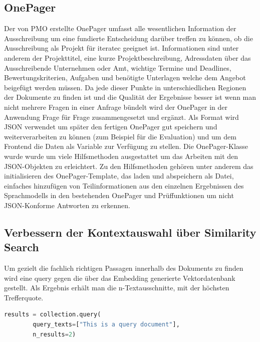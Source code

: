 \subsection{OnePager}
Der von PMO erstellte OnePager umfasst alle wesentlichen Information der Ausschreibung um eine fundierte Entscheidung darüber treffen zu 
können, ob die Ausschreibung als Projekt für iteratec geeignet ist. Informationen sind unter anderem der Projekttitel, eine kurze Projektbeschreibung, 
Adressdaten über das Ausschreibende Unternehmen oder Amt, wichtige Termine und Deadlines, Bewertungskriterien, Aufgaben und benötigte Unterlagen welche 
dem Angebot beigefügt werden müssen. Da jede dieser Punkte in unterschiedlichen Regionen der Dokumente zu finden ist und die Qualität der Ergebnisse 
besser ist wenn man nicht mehrere Fragen in einer Anfrage bündelt wird der OnePager in der Anwendung Frage für Frage zusammengesetzt und ergänzt.
Als Format wird JSON verwendet um später den fertigen OnePager gut speichern und weiterverarbeiten zu können (zum Beispiel für die Evaluation) und um dem
Frontend die Daten als Variable zur Verfügung zu stellen. Die OnePager-Klasse wurde wurde um viele Hilfsmethoden ausgestattet um das Arbeiten mit den 
JSON-Objekten zu erleichtert. Zu den Hilfsmethoden gehören unter anderem das initialisieren des OnePager-Template, das laden und abspeichern als Datei, 
einfaches hinzufügen von Teilinformationen aus den einzelnen Ergebnissen des Sprachmodells in den bestehenden OnePager und Prüffunktionen um nicht 
JSON-Konforme Antworten zu erkennen.

\subsection{Verbessern der Kontextauswahl über Similarity Search}
\label{chap:Verbessern der Kontextauswahl über Similarity Search}
Um gezielt die fachlich richtigen Passagen innerhalb des Dokuments zu finden wird eine query gegen die über das Embedding generierte Vektordatenbank gestellt.
Als Ergebnis erhält man die n-Textausschnitte, mit der höchsten Trefferquote. 

\begin{lstlisting}[language=Python, caption=Code einer Similarity Search, label=lst:vectorquery_listing]
    results = collection.query(
        query_texts=["This is a query document"],
        n_results=2)
\end{lstlisting}

